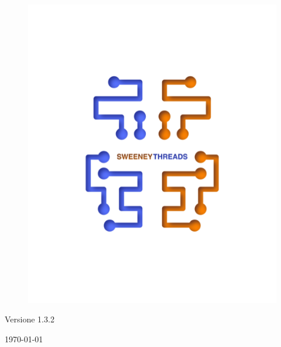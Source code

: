 \documentclass[a4paper]{article}
\begin{document}
\begin{titlepage}
		\begin{figure}[H]
			\centering
			\includegraphics[scale=0.8]{sweeney.png}
		\end{figure}
		\begin{center}
			Versione 1.3.2
		\end{center}
		{\large \today}\\[3cm]
		\vfill
	\end{titlepage}


	\tableofcontents

	\newpage
\end{document}
